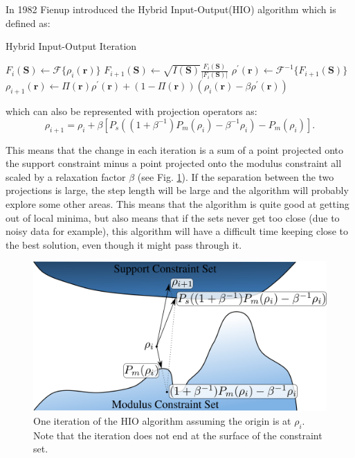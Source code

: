 In 1982 Fienup introduced the Hybrid Input-Output(HIO) algorithm \cite{Fienup1982Phase}
which is defined as:
\begin{algorithm}
\caption{Hybrid Input-Output Iteration}
\begin{algorithmic}
  \STATE $F_{i}(\mathbf S) \gets \mathscr{F}\{\rho_i(\mathbf r)\}$
  \STATE $F_{i+1}(\mathbf S) \gets \sqrt{I(\mathbf S)} \frac{F_i(\mathbf
    S)}{|F_i(\mathbf S)|}$
  \STATE $\rho^{\prime}(\mathbf r) \gets \mathscr{F}^{-1}\{F_{i+1}(\mathbf S)\}$
  \STATE $\rho_{i+1}(\mathbf r) \gets \Pi(\mathbf r) \rho^{\prime}(\mathbf r) +
  (1-\Pi(\mathbf r)) (\rho_i(\mathbf r)-\beta \rho^{\prime}(\mathbf r))$
\end{algorithmic}
\end{algorithm}

which can also be represented with projection operators
\cite{Thibault2007Algorithmic} as:
\begin{equation}
  \rho_{i+1} = \rho_{i} + \beta\left[P_s((1+\beta^{-1})P_m(\rho_i)-\beta^{-1}
    \rho_{i}) -P_m(\rho_i)\right] .
\end{equation}

This means that the change in each iteration is a sum of a point projected onto the
support constraint minus a point projected onto the modulus constraint all
scaled by a relaxation factor $\beta$ (see Fig. \ref{Fig:HIO_Iteration}). If the
separation between the two 
projections is large, the step length will be large and the algorithm will
probably explore some other areas. This means that the algorithm is quite good
at getting out of local minima, but also means that if the sets never get too
close (due to noisy data for example), this algorithm will have a difficult time
keeping close to the best solution, even though it might pass through it.

\begin{figure}[h]
\centering
  \includegraphics[width=0.9 \columnwidth]{Image_Reconstruction/hio_iteration.png}
  \caption{One iteration of the HIO algorithm assuming the origin is at
    $\rho_i$. Note that the iteration does not end at the surface of the
    constraint set.}
  \label{Fig:HIO_Iteration}
\end{figure}

